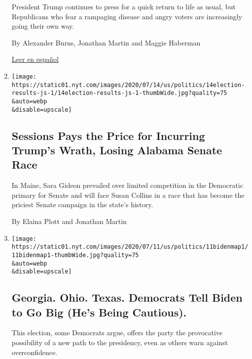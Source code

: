 \begin{enumerate}
  President Trump continues to press for a quick return to life as
  usual, but Republicans who fear a rampaging disease and angry voters
  are increasingly going their own way.

  By Alexander Burns, Jonathan Martin and Maggie Haberman

  \href{https://www.nytimes.com/es/2020/07/21/espanol/estados-unidos/donald-trump-coronavirus-republicanos.html}{Leer
  en español}
\item
  \href{/2020/07/14/us/politics/Election-primary-runoff-results.html}{}

  \texttt{[image: https://static01.nyt.com/images/2020/07/14/us/politics/14election-results-js-1/14election-results-js-1-thumbWide.jpg?quality=75\\\&auto=webp\\\&disable=upscale]}

  \hypertarget{sessions-pays-the-price-for-incurring-trumps-wrath-losing-alabama-senate-race}{%
  \subsection{Sessions Pays the Price for Incurring Trump's Wrath,
  Losing Alabama Senate
  Race}\label{sessions-pays-the-price-for-incurring-trumps-wrath-losing-alabama-senate-race}}

  In Maine, Sara Gideon prevailed over limited competition in the
  Democratic primary for Senate and will face Susan Collins in a race
  that has become the priciest Senate campaign in the state's history.

  By Elaina Plott and Jonathan Martin
\item
  \href{/2020/07/11/us/politics/trump-biden-2020-election.html}{}

  \texttt{[image: https://static01.nyt.com/images/2020/07/11/us/politics/11bidenmap1/11bidenmap1-thumbWide.jpg?quality=75\\\&auto=webp\\\&disable=upscale]}

  \hypertarget{georgia-ohio-texas-democrats-tell-biden-to-go-big-hes-being-cautious}{%
  \subsection{Georgia. Ohio. Texas. Democrats Tell Biden to Go Big (He's
  Being
  Cautious).}\label{georgia-ohio-texas-democrats-tell-biden-to-go-big-hes-being-cautious}}

  This election, some Democrats argue, offers the party the provocative
  possibility of a new path to the presidency, even as others warn
  against overconfidence.


\end{enumerate}
